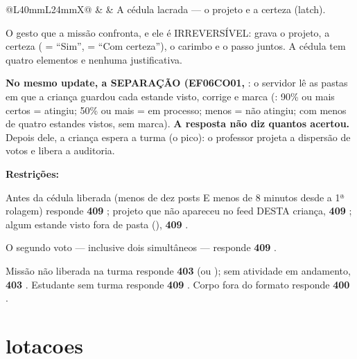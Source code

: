 \begin{tabularx}{\linewidth}{@{}L{40mm}L{24mm}X@{}}
\zebra {} &  & A cédula lacrada --- o projeto e a certeza (latch).\par O gesto que a missão confronta, e ele é IRREVERSÍVEL: grava o projeto, a certeza ( = \enquote{Sim},  = \enquote{Com certeza}), o carimbo e o passo  juntos. A cédula tem quatro elementos e nenhuma justificativa.\par \textbf{No mesmo update, a SEPARAÇÃO (EF06CO01, }: o servidor lê as pastas em que a criança guardou cada estande visto, corrige e marca (: 90\% ou mais certos = atingiu; 50\% ou mais = em processo; menos = não atingiu; com menos de quatro estandes vistos, sem marca). \textbf{A resposta não diz quantos acertou.} Depois dele, a criança espera a turma (o pico): o professor projeta a dispersão de votos e libera a auditoria.\par \textbf{Restrições:}\par \hspace*{1em}\textbullet{} Antes da cédula liberada (menos de dez posts E menos de 8 minutos desde a 1ª rolagem) responde \textbf{409} ; projeto que não apareceu no feed DESTA criança, \textbf{409} ; algum estande visto fora de pasta (), \textbf{409} .\par \hspace*{1em}\textbullet{} O segundo voto --- inclusive dois simultâneos --- responde \textbf{409} .\par \hspace*{1em}\textbullet{} Missão não liberada na turma responde \textbf{403}  (ou ); sem atividade em andamento, \textbf{403} . Estudante sem turma responde \textbf{409} . Corpo fora do formato responde \textbf{400} .\\
\bottomrule
\end{tabularx}

\section{lotacoes}

